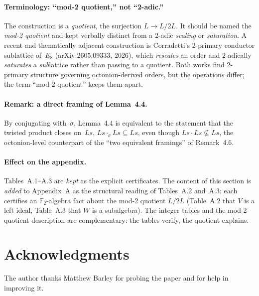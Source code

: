 \documentclass[11pt]{amsart}
\newcommand{\FF}{\mathbb{F}}
\theoremstyle{remark}
\begin{document}
\paragraph{Terminology: ``mod-2 quotient,'' not ``2-adic.''}
The construction is a \emph{quotient}, the surjection $L\to L/2L$.
It should be named the \emph{mod-2 quotient} and kept verbally distinct
from a $2$-adic \emph{scaling} or \emph{saturation}.  A recent and
thematically adjacent construction is Corradetti's $2$-primary conductor
sublattice of~$E_8$ (arXiv:2605.09333, 2026), which \emph{rescales} an
order and $2$-adically \emph{saturates} a \emph{sub}lattice rather than
passing to a quotient.  Both works find $2$-primary structure governing
octonion-derived orders, but the operations differ; the term ``mod-2
quotient'' keeps them apart.

\paragraph{Remark: a direct framing of Lemma~4.4.}
By conjugating with~$\sigma$, Lemma~4.4 is equivalent to the statement
that the twisted product closes on~$Ls$, $Ls\cdot_\sigma Ls\subseteq
Ls$, even though $Ls\cdot Ls\not\subseteq Ls$, the octonion-level
counterpart of the ``two equivalent framings'' of Remark~4.6.

\paragraph{Effect on the appendix.}
Tables~A.1--A.3 are \emph{kept} as the explicit certificates.  The
content of this section is \emph{added} to Appendix~A as the structural
reading of Tables~A.2 and~A.3: each certifies an $\FF_2$-algebra fact
about the mod-2 quotient $L/2L$ (Table~A.2 that $V$ is a left ideal,
Table~A.3 that $W$ is a subalgebra).  The integer tables and the mod-2-quotient description
are complementary: the tables verify, the quotient explains.

\section*{Acknowledgments}

The author thanks Matthew Barley for probing the paper and for help in
improving it.
\end{document}
